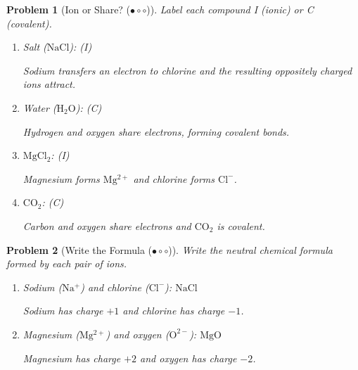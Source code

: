 \documentclass[a4paper,11pt]{article}
\newcommand{\easy}{(\ensuremath{\bullet \circ \circ})}
\theoremstyle{listprobstyle}
\newtheorem{problem}{Problem}
\newenvironment{solution}
    {\par\begingroup\color{BrickRed}}
    {\par\endgroup}
\begin{document}
\begin{problem}[Ion or Share? \easy]
Label each compound I (ionic) or C (covalent).
\vspace{-0.6\baselineskip}
\begin{enumerate}[label=\alph*),itemsep=0pt,parsep=0pt,topsep=0pt]
\item Salt ($\mathrm{NaCl}$): (\textcolor{BrickRed}{I})
\begin{solution}
Sodium transfers an electron to chlorine and the resulting oppositely
charged ions attract.
\end{solution}
\vspace{0.5\baselineskip}

\item Water ($\mathrm{H_2O}$): (\textcolor{BrickRed}{C})
\begin{solution}
Hydrogen and oxygen share electrons, forming covalent bonds.
\end{solution}
\vspace{0.5\baselineskip}

\item $\mathrm{MgCl_2}$: (\textcolor{BrickRed}{I})
\begin{solution}
Magnesium forms $\mathrm{Mg^{2+}}$ and chlorine forms $\mathrm{Cl^-}$.
\end{solution}
\vspace{0.5\baselineskip}

\item $\mathrm{CO_2}$: (\textcolor{BrickRed}{C})
\begin{solution}
Carbon and oxygen share electrons and $\mathrm{CO_2}$ is covalent.
\end{solution}
\end{enumerate}
\end{problem}


\begin{problem}[Write the Formula \easy]
Write the neutral chemical formula formed by each pair of ions.
\vspace{-0.6\baselineskip}
\begin{enumerate}[label=\alph*),itemsep=0pt,parsep=0pt,topsep=0pt]
\item Sodium ($\mathrm{Na^+}$) and chlorine ($\mathrm{Cl^-}$):
    \underline{
        \textcolor{BrickRed}{\phantom{X}$\mathrm{NaCl}$\phantom{X}}
    }
    \begin{solution}
    Sodium has charge $+1$ and chlorine has charge $-1$.
    \end{solution}
\vspace{0.5\baselineskip}

\item Magnesium ($\mathrm{Mg^{2+}}$) and oxygen ($\mathrm{O^{2-}}$):
    \underline{
        \textcolor{BrickRed}{\phantom{X}$\mathrm{MgO}$\phantom{X}}
    }
    \begin{solution}
    Magnesium has charge $+2$ and oxygen has charge $-2$.
    \end{solution}
\end{enumerate}
\end{problem}
\end{document}
